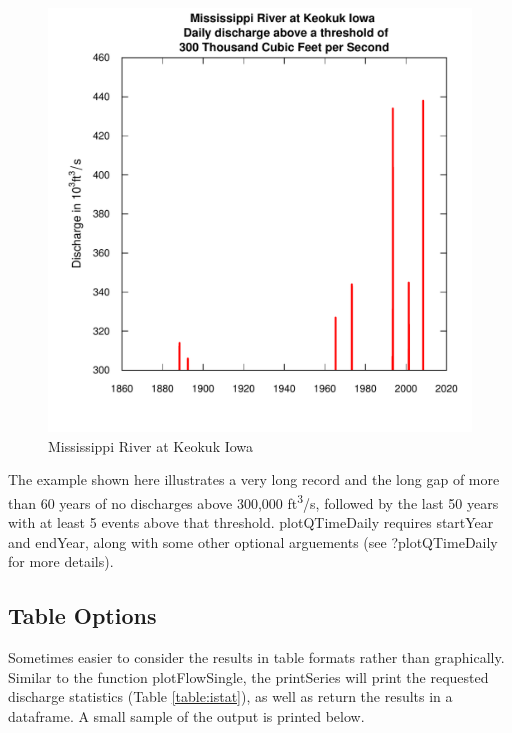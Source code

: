 \documentclass[a4paper,11pt]{article}\usepackage[]{graphicx}\usepackage[]{color}
\newenvironment{knitrout}{}{} %
\begin{document}
\begin{knitrout}
\begin{figure}[]
\includegraphics[width=1\linewidth,height=1\linewidth]{figure/Mississippi} \caption[Mississippi River at Keokuk Iowa]{Mississippi River at Keokuk Iowa\label{fig:Mississippi}}
\end{figure}


\end{knitrout}


The example shown here illustrates a very long record and the long gap of more than 60 years of no discharges above 300,000 ft\textsuperscript{3}/s, followed by the last 50 years with at least 5 events above that threshold. plotQTimeDaily requires startYear and endYear, along with some other optional arguements (see ?plotQTimeDaily for more details).

\FloatBarrier

\subsection{Table Options}
\label{sec:tableOptions}
Sometimes easier to consider the results in table formats rather than graphically. Similar to the function plotFlowSingle, the printSeries will print the requested discharge statistics (Table \ref{table:istat}), as well as return the results in a dataframe. A small sample of the output is printed below.
\end{document}
